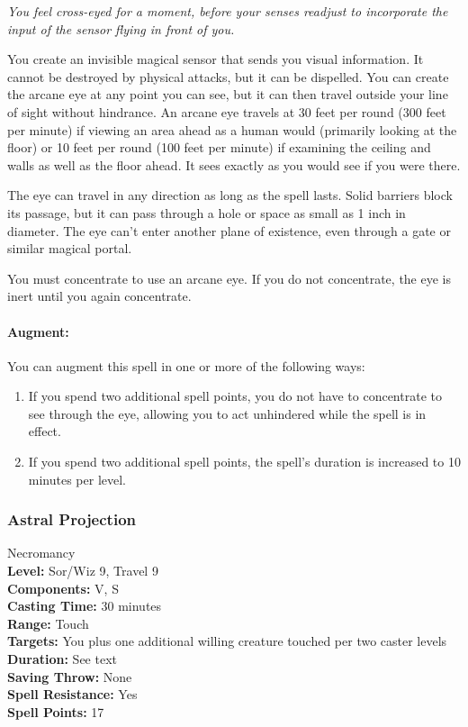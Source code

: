 \emph{You feel cross-eyed for a moment, before your senses readjust to incorporate the input of the sensor flying in front of you.}

You create an invisible magical sensor that sends you visual information. 
It cannot be destroyed by physical attacks, but it can be dispelled.
You can create the arcane eye at any point you can see, but it can then travel outside your line of sight without hindrance. 
An arcane eye travels at 30 feet per round (300 feet per minute) 
if viewing an area ahead as a human would (primarily looking at the floor) 
or 10 feet per round (100 feet per minute) if examining the ceiling and walls as well as the floor ahead. 
It sees exactly as you would see if you were there.

The eye can travel in any direction as long as the spell lasts. 
Solid barriers block its passage, but it can pass through a hole or space as small as 1 inch in diameter. 
The eye can't enter another plane of existence, even through a gate or similar magical portal.

You must concentrate to use an arcane eye. If you do not concentrate, the eye is inert until you again concentrate.

\paragraph{Augment:} You can augment this spell in one or more of the following ways:
\begin{enumerate}
 \item If you spend two additional spell points, you do not have to concentrate to see through the
 eye, allowing you to act unhindered while the spell is in effect.
 \item If you spend two additional spell points, the spell's duration is increased to 10 minutes per level.
\end{enumerate}

\subsubsection{Astral Projection} 
\label{Spell:AstralProjection}
Necromancy
\\ \textbf{Level:} Sor/Wiz 9, Travel 9
\\ \textbf{Components:} V, S
\\ \textbf{Casting Time:} 30 minutes
\\ \textbf{Range:} Touch
\\ \textbf{Targets:} You plus one additional willing creature touched per two caster levels
\\ \textbf{Duration:} See text
\\ \textbf{Saving Throw:} None
\\ \textbf{Spell Resistance:} Yes
\\ \textbf{Spell Points:} 17

